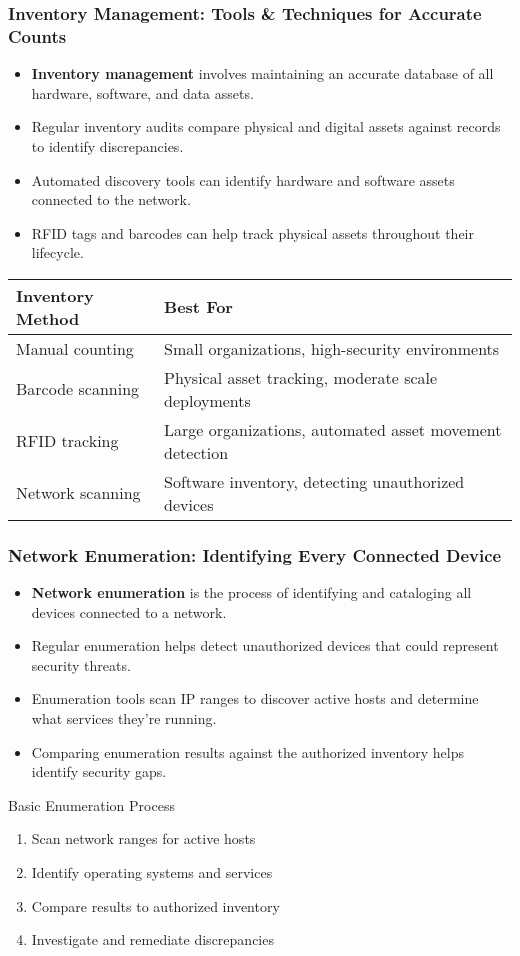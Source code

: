 \documentclass{beamer}
\begin{document}
\begin{frame}
\frametitle{Inventory Management: Tools \& Techniques for Accurate Counts}
\begin{itemize}
\item \textbf{Inventory management} involves maintaining an accurate database of all hardware, software, and data assets.
\item Regular inventory audits compare physical and digital assets against records to identify discrepancies.
\item Automated discovery tools can identify hardware and software assets connected to the network.
\item RFID tags and barcodes can help track physical assets throughout their lifecycle.
\end{itemize}

\begin{table}
    \scriptsize
\begin{tabular}{|l|p{5cm}|}
\hline
\textbf{Inventory Method} & \textbf{Best For} \\
\hline
Manual counting & Small organizations, high-security environments \\
Barcode scanning & Physical asset tracking, moderate scale deployments \\
RFID tracking & Large organizations, automated asset movement detection \\
Network scanning & Software inventory, detecting unauthorized devices \\
\hline
\end{tabular}
\end{table}
\end{frame}

\begin{frame}
\frametitle{Network Enumeration: Identifying Every Connected Device}
\begin{itemize}
\item \textbf{Network enumeration} is the process of identifying and cataloging all devices connected to a network.
\item Regular enumeration helps detect unauthorized devices that could represent security threats.
\item Enumeration tools scan IP ranges to discover active hosts and determine what services they're running.
\item Comparing enumeration results against the authorized inventory helps identify security gaps.
\end{itemize}

\begin{exampleblock}{Basic Enumeration Process}
\begin{enumerate}
\item Scan network ranges for active hosts
\item Identify operating systems and services
\item Compare results to authorized inventory
\item Investigate and remediate discrepancies
\end{enumerate}
\end{exampleblock}
\end{frame}
\end{document}
